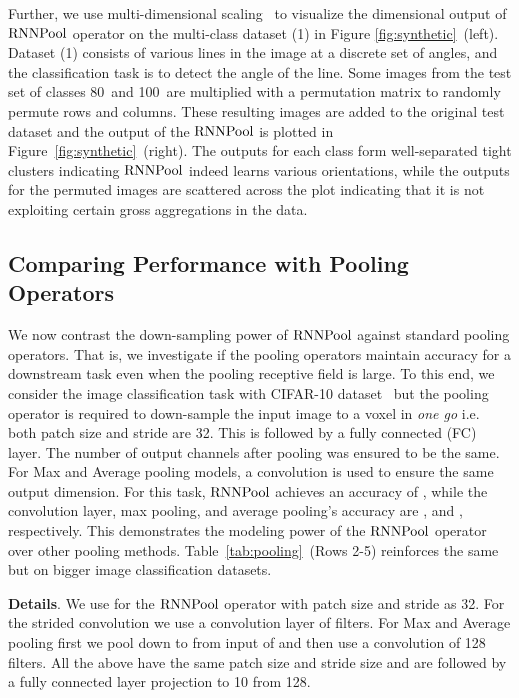 \documentclass[10pt]{article}
\newcommand{\rpool}{\ensuremath{{\rm RNNPool}}\xspace}
\begin{document}
Further, we use multi-dimensional scaling~\citep{mead1992review} to
visualize the  dimensional output of \rpool operator
on the multi-class dataset (1) in Figure
\ref{fig:synthetic}~(left). Dataset (1) consists of various lines in
the image at a discrete set of angles, and the classification task is
to detect the angle of the line. Some images from the test set of
classes 80\textdegree~and 100\textdegree~are multiplied with a
permutation matrix to randomly permute rows and columns. These
resulting images are added to the original test dataset and the output
of the \rpool is plotted in Figure~\ref{fig:synthetic}~(right). The
outputs for each class form well-separated tight clusters indicating
\rpool indeed learns various orientations, while the outputs for the
permuted images are scattered across the plot indicating that it is
not exploiting certain gross aggregations in the data.



\subsection{Comparing Performance with Pooling Operators}
\label{sec:cifar}
We now contrast the down-sampling power of \rpool against standard
pooling operators. That is, we investigate if the pooling operators
maintain accuracy for a downstream task even when the pooling
receptive field is large. To this end, we consider the image
classification task with CIFAR-10 dataset~\citep{krizhevsky2009learning} but the pooling operator is
required to down-sample the input  image to a 
voxel in {\em one go } i.e. both patch size and stride are 32. This is
followed by a fully connected (FC) layer. The number of output
channels after pooling was ensured to be the same. For Max and Average
pooling models, a  convolution is used to ensure the same
output dimension. For this task, \rpool achieves an accuracy of
{}, while the convolution layer, max pooling, and average
pooling's accuracy are ,  and ,
respectively. This demonstrates the modeling power of the \rpool
operator over other pooling methods. Table~\ref{tab:pooling}~(Rows
2-5) reinforces the same but on bigger image classification datasets.

\textbf{Details}. We use  for the \rpool operator with
patch size and stride as 32. For the strided convolution we use a
convolution layer of  filters. For Max and Average
pooling first we pool down to  from input of  and then use a  convolution of 128
filters. All the above have the same patch size and stride size and
are followed by a fully connected layer projection to 10 from 128.
\end{document}
